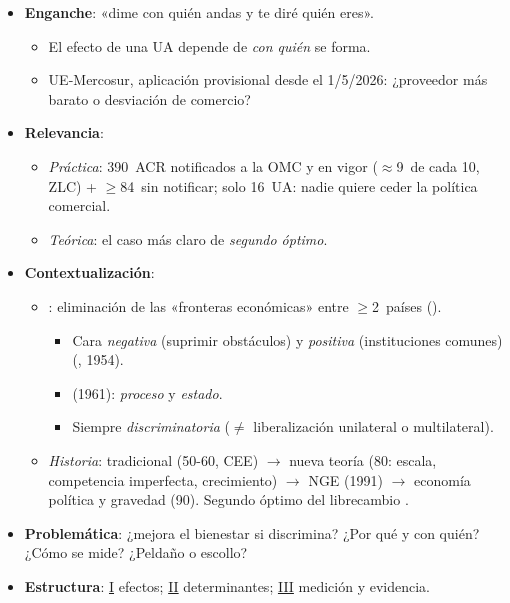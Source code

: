 \documentclass{article}
\begin{document}
\cabecerarepaso
\begin{columnas}

\begin{itemize}
\item \textbf{Enganche}: «dime con quién andas y te diré quién eres».
  \begin{itemize}
  \item El efecto de una UA depende de \emph{con quién} se forma.
  \item UE-Mercosur, aplicación provisional desde el 1/5/2026: ¿proveedor más barato o desviación de comercio?
  \end{itemize}
\item \textbf{Relevancia}:
  \begin{itemize}
  \item \emph{Práctica}: 390~ACR notificados a la OMC y en vigor ($\approx$9~de cada 10, ZLC) + $\geq$84~sin notificar; solo 16~UA: nadie quiere ceder la política comercial.
  \item \emph{Teórica}: el caso más claro de \emph{segundo óptimo}.
  \end{itemize}
\item \textbf{Contextualización}:
  \begin{itemize}
  \item {}: eliminación de las «fronteras económicas» entre $\geq$2~países ().
    \begin{itemize}
    \item Cara \emph{negativa} (suprimir obstáculos) y \emph{positiva} (instituciones comunes) (, 1954).
    \item {} (1961): \emph{proceso} y \emph{estado}.
    \item Siempre \emph{discriminatoria} ($\neq$ liberalización unilateral o multilateral).
    \end{itemize}
  \item \emph{Historia}: tradicional (50-60, CEE) $\to$ nueva teoría (80: escala, competencia imperfecta, crecimiento) $\to$ NGE (1991) $\to$ economía política y gravedad (90). Segundo óptimo del librecambio .
  \end{itemize}
\item \textbf{Problemática}: ¿mejora el bienestar si discrimina? ¿Por qué y con quién? ¿Cómo se mide? ¿Peldaño o escollo?
\item \textbf{Estructura}: \hyperref[rep:I]{I} efectos; \hyperref[rep:II]{II} determinantes; \hyperref[rep:III]{III} medición y evidencia.

\end{itemize}
\end{columnas}
\end{document}
